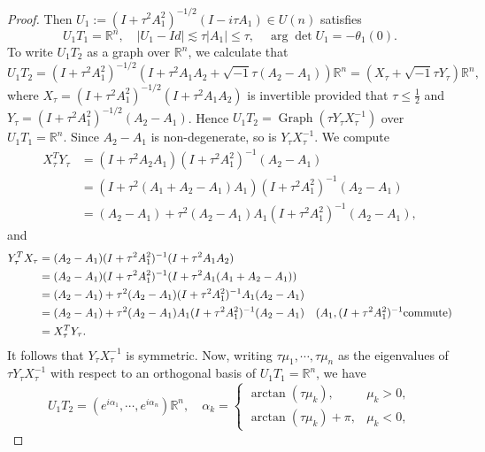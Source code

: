 \documentclass[11pt,a4paper]{article}
\numberwithin{equation}{section}%
\theoremstyle{definition}
\newcommand{\R}{\mathbb{R}}
\begin{document}
\begin{proof}
       Then $U_1:=(I+\tau^2 A_1^2)^{-1/2}(I-i\tau A_1)\in U(n)$ satisfies
       $$U_1T_1=\R^n,\quad |U_1-Id|\lesssim \tau|A_1|\leqslant\tau,\quad \arg \det U_1=-\theta_{1}(0).$$
       To write $U_1T_2$ as a graph over $\R^n$, we calculate that 
       $$U_1T_2=(I+\tau^2A_1^2)^{-1/2}(I+\tau^2A_1A_2+\sqrt{-1}\tau (A_2-A_1))\R^n=(X_{\tau}+\sqrt{-1}\tau Y_\tau)\R^n,$$
       where $X_\tau=(I+\tau^2A_1^2)^{-1/2}(I+\tau^2A_1A_2)$ is invertible provided that $\tau\leqslant \frac{1}{2}$ and $Y_\tau=(I+\tau^2A_1^2)^{-1/2}(A_2-A_1)$. Hence $U_1T_2=\operatorname{Graph}(\tau Y_{\tau}X_{\tau}^{-1})$ over $U_1T_1=\R^n$. Since $A_2-A_1$ is non-degenerate, so is $Y_{\tau}X_{\tau}^{-1}$. We compute 
        \begin{equation}
        \begin{aligned}
            \label{eqn:symmetricgraphmatrix}
         X_\tau^TY_\tau&=(I+\tau^2A_2A_1)(I+\tau^{2}A_1^{2})^{-1}(A_2-A_1)
               \\&=(I+\tau^2(A_1+A_2-A_1)A_1)(I+\tau^2A_1^2)^{-1}(A_2-A_1)
               \\&=(A_2-A_1)+\tau^2(A_2-A_1)A_1(I+\tau^2A_1^2)^{-1}(A_2-A_1),
            \end{aligned}
        \end{equation}
       and 
       \begin{equation}
           \begin{aligned}
               Y_\tau^T X_\tau&=(A_2-A_1)(I+\tau^2A_1^2)^{-1}(I+\tau^2A_1A_2)
               \\&=(A_2-A_1)(I+\tau^2A_1^2)^{-1}(I+\tau^2A_1(A_1+A_2-A_1))
               \\&=(A_2-A_1)+\tau^2(A_2-A_1)(I+\tau^2A_1^2)^{-1}A_1(A_2-A_1)
               \\&=(A_2-A_1)+\tau^2(A_2-A_1)A_1(I+\tau^2A_1^2)^{-1}(A_2-A_1)\quad (A_1,(I+\tau^2A_1^2)^{-1} \textnormal{commute})
               \\&=X_\tau^TY_\tau.
           \end{aligned}
       \end{equation}
       It follows that $Y_\tau X_\tau^{-1}$ is symmetric. 
       Now, writing $\tau \mu_1,\cdots,\tau\mu_n$ as the eigenvalues of $\tau Y_\tau X_\tau^{-1}$ with respect to an orthogonal basis of $U_1T_1=\R^n$, we have 
       $$U_1T_2=(e^{i\alpha_1},\cdots,e^{i\alpha_n})\R^n,\quad \alpha_k=\left\{\begin{array}{ll}
          \arctan(\tau\mu_k),  & \mu_k>0, \\
            \arctan(\tau\mu_k)+\pi, & \mu_k<0,

\end{array}$$
\end{proof}
\end{document}
